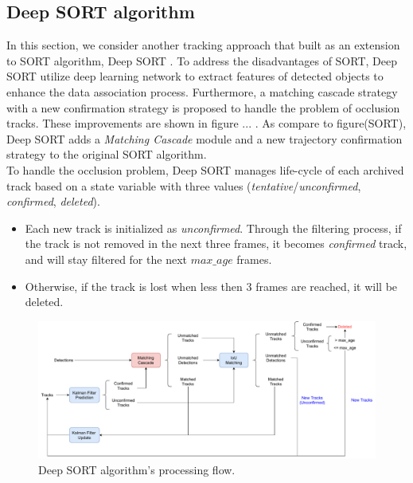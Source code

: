 \subsection{Deep SORT algorithm}
\label{sec:deep_sort}
In this section, we consider another tracking approach that built as an extension to SORT algorithm, Deep SORT \cite{wojke2017simple}. To address the disadvantages of SORT, Deep SORT utilize deep learning network to extract features of detected objects to enhance the data association process. Furthermore, a matching cascade strategy with a new confirmation strategy is proposed to handle the problem of occlusion tracks. These improvements are shown in figure ... .
As compare to figure(SORT), Deep SORT adds a \textit{Matching Cascade} module and a new trajectory confirmation strategy to the original SORT algorithm. \\
To handle the occlusion problem, Deep SORT manages life-cycle of each archived track based on a state variable with three values (\textit{tentative}/\textit{unconfirmed}, \textit{confirmed}, \textit{deleted}). 
\begin{itemize}
    \item Each new track is initialized as \textit{unconfirmed}. Through the filtering process, if the track is not removed in the next three frames, it becomes \textit{confirmed} track, and will stay filtered for the next $max\_age$ frames.
    \item Otherwise, if the track is lost when less then 3 frames are reached, it will be deleted.
\end{itemize}

\begin{figure}[t!]
    \centering
    \includegraphics[width=\textwidth]{images/DeepSORT.pdf}
    \caption{Deep SORT algorithm's processing flow.}
    \label{fig:DeepSORT_overview}
\end{figure}

